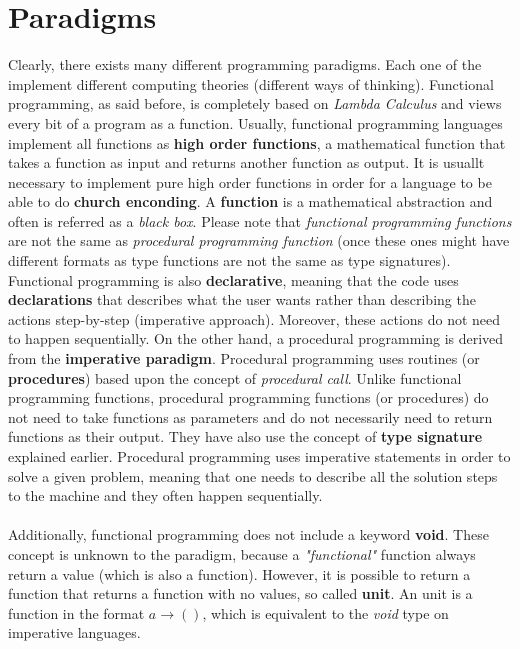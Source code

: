 \documentclass[conference]{IEEEtran}
\begin{document}
\section{Paradigms}
Clearly, there exists many different programming paradigms. Each one of the implement different computing theories (different ways of thinking). Functional programming, as said before, is completely based on \textit{Lambda Calculus} and views every bit of a program as a function. Usually, functional programming languages implement all functions as \textbf{high order functions}, a mathematical function that takes a function as input and returns another function as output. It is usuallt necessary to implement pure high order functions in order for a language to be able to do \textbf{church enconding}. A \textbf{function} is a mathematical abstraction and often is referred as a \textit{black box}. Please note that \textit{functional programming functions} are not the same as \textit{procedural programming function} (once these ones might have different formats as type functions are not the same as type signatures). Functional programming is also \textbf{declarative}, meaning that the code uses \textbf{declarations} that describes what the user wants rather than describing the actions step-by-step (imperative approach). Moreover, these actions do not need to happen sequentially. On the other hand, a procedural programming is derived from the \textbf{imperative paradigm}. Procedural programming uses routines (or \textbf{procedures}) based upon the concept of \textit{procedural call}. Unlike functional programming functions, procedural programming functions (or procedures) do not need to take functions as parameters and do not necessarily need to return functions as their output. They have also use the concept of \textbf{type signature} explained earlier. Procedural programming uses imperative statements in order to solve a given problem, meaning that one needs to describe all the solution steps to the machine and they often happen sequentially.
\\\\
Additionally, functional programming does not include a keyword \textbf{void}. These concept is unknown to the paradigm, because a \textit{"functional"} function always return a value (which is also a function). However, it is possible to return a function that returns a function with no values, so called \textbf{unit}. An unit is a function in the format $a \rightarrow ()$, which is equivalent to the \textit{void} type on imperative languages.
\\\\
\end{document}
